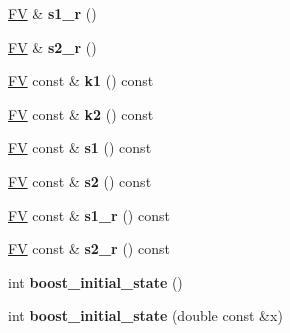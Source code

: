\begin{DoxyCompactItemize}
\item 
\hypertarget{classPS__2__2_a275418b865aad845f483b719bfe0a05e}{\hyperlink{classFV}{F\-V} \& {\bfseries s1\-\_\-r} ()}\label{classPS__2__2_a275418b865aad845f483b719bfe0a05e}

\item 
\hypertarget{classPS__2__2_a8e5e2217a1b30322d0d5ea7c44cbb8f0}{\hyperlink{classFV}{F\-V} \& {\bfseries s2\-\_\-r} ()}\label{classPS__2__2_a8e5e2217a1b30322d0d5ea7c44cbb8f0}

\item 
\hypertarget{classPS__2__2_a50a2e1f1876ab83fbee307434053f9f5}{\hyperlink{classFV}{F\-V} const \& {\bfseries k1} () const }\label{classPS__2__2_a50a2e1f1876ab83fbee307434053f9f5}

\item 
\hypertarget{classPS__2__2_af926b46a1c778aa2e89e6c21ca7fbe1b}{\hyperlink{classFV}{F\-V} const \& {\bfseries k2} () const }\label{classPS__2__2_af926b46a1c778aa2e89e6c21ca7fbe1b}

\item 
\hypertarget{classPS__2__2_a3da95bed1ffd46845bbc52650aab9118}{\hyperlink{classFV}{F\-V} const \& {\bfseries s1} () const }\label{classPS__2__2_a3da95bed1ffd46845bbc52650aab9118}

\item 
\hypertarget{classPS__2__2_afa5b103e0ba2035aa20c0e07ea479d7d}{\hyperlink{classFV}{F\-V} const \& {\bfseries s2} () const }\label{classPS__2__2_afa5b103e0ba2035aa20c0e07ea479d7d}

\item 
\hypertarget{classPS__2__2_aff5dddee70717a76d27499954e776bf1}{\hyperlink{classFV}{F\-V} const \& {\bfseries s1\-\_\-r} () const }\label{classPS__2__2_aff5dddee70717a76d27499954e776bf1}

\item 
\hypertarget{classPS__2__2_a0153c1764b9e9820f74e2af790b55290}{\hyperlink{classFV}{F\-V} const \& {\bfseries s2\-\_\-r} () const }\label{classPS__2__2_a0153c1764b9e9820f74e2af790b55290}

\item 
\hypertarget{classPS__2__2_a62103a2d987ed8b04918d584e1c7c562}{int {\bfseries boost\-\_\-initial\-\_\-state} ()}\label{classPS__2__2_a62103a2d987ed8b04918d584e1c7c562}

\item 
\hypertarget{classPS__2__2_abdf4c563c0c67169a478fb7719581a35}{int {\bfseries boost\-\_\-initial\-\_\-state} (double const \&x)}\label{classPS__2__2_abdf4c563c0c67169a478fb7719581a35}


\end{DoxyCompactItemize}
